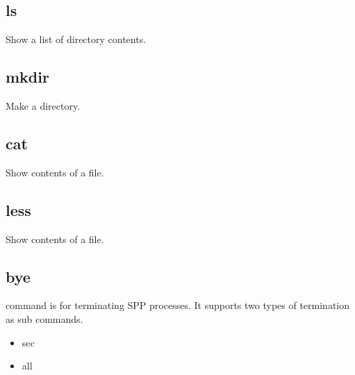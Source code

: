 \documentclass[a4paper,11pt,openany,oneside,english]{sphinxmanual}
\begin{document}
\subsection{ls}
\label{\detokenize{commands/common:ls}}\label{\detokenize{commands/common:commands-common-ls}}
Show a list of directory contents.

\begin{sphinxVerbatim}[commandchars=\\\{\},formatcom=\footnotesize]
\end{sphinxVerbatim}


\subsection{mkdir}
\label{\detokenize{commands/common:mkdir}}\label{\detokenize{commands/common:commands-common-mkdir}}
Make a directory.

\begin{sphinxVerbatim}[commandchars=\\\{\},formatcom=\footnotesize]
\end{sphinxVerbatim}


\subsection{cat}
\label{\detokenize{commands/common:cat}}\label{\detokenize{commands/common:commands-common-cat}}
Show contents of a file.

\begin{sphinxVerbatim}[commandchars=\\\{\},formatcom=\footnotesize]
\end{sphinxVerbatim}


\subsection{less}
\label{\detokenize{commands/common:less}}\label{\detokenize{commands/common:commands-common-less}}
Show contents of a file.

\begin{sphinxVerbatim}[commandchars=\\\{\},formatcom=\footnotesize]
\end{sphinxVerbatim}


\subsection{bye}
\label{\detokenize{commands/common:bye}}\label{\detokenize{commands/common:commands-common-bye}}
 command is for terminating SPP processes.
It supports two types of termination as sub commands.
\begin{itemize}
\item {} 
sec

\item {} 
all

\end{itemize}
\end{document}
